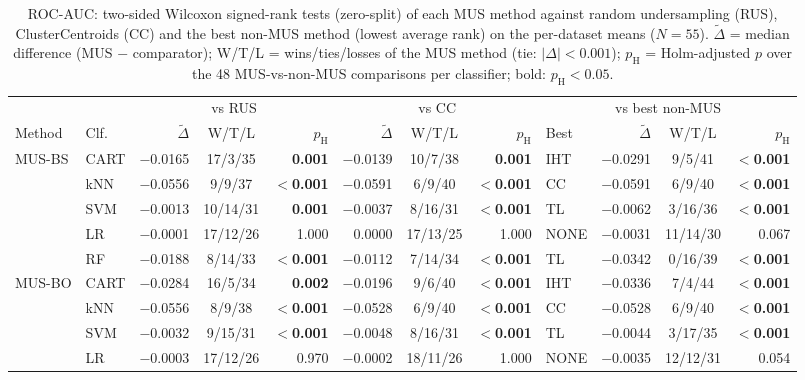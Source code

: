\begin{table}[!htbp]
\centering
\caption{ROC-AUC: two-sided Wilcoxon signed-rank tests (zero-split) of each MUS method against random undersampling (RUS), ClusterCentroids (CC) and the best non-MUS method (lowest average rank) on the per-dataset means ($N=55$). $\tilde\Delta$ = median difference (MUS $-$ comparator); W/T/L = wins/ties/losses of the MUS method (tie: $|\Delta|<0.001$); $p_\mathrm{H}$ = Holm-adjusted $p$ over the 48 MUS-vs-non-MUS comparisons per classifier; bold: $p_\mathrm{H}<0.05$.}
\label{tab:wilcoxon_auc}
\scriptsize
\setlength{\tabcolsep}{3pt}
\begin{adjustbox}{max width=\linewidth}
\begin{tabular}{llrcrrcrlrcr}
\toprule
 & & \multicolumn{3}{c}{vs RUS} & \multicolumn{3}{c}{vs CC} & \multicolumn{4}{c}{vs best non-MUS} \\
\cmidrule(lr){3-5}\cmidrule(lr){6-8}\cmidrule(lr){9-12}
Method & Clf. & $\tilde\Delta$ & W/T/L & $p_\mathrm{H}$ & $\tilde\Delta$ & W/T/L & $p_\mathrm{H}$ & Best & $\tilde\Delta$ & W/T/L & $p_\mathrm{H}$ \\
\midrule
MUS-BS & CART & $-$0.0165 & 17/3/35 & \textbf{0.001} & $-$0.0139 & 10/7/38 & \textbf{0.001} & IHT & $-$0.0291 & 9/5/41 & \textbf{$<$0.001} \\
 & kNN & $-$0.0556 & 9/9/37 & \textbf{$<$0.001} & $-$0.0591 & 6/9/40 & \textbf{$<$0.001} & CC & $-$0.0591 & 6/9/40 & \textbf{$<$0.001} \\
 & SVM & $-$0.0013 & 10/14/31 & \textbf{0.001} & $-$0.0037 & 8/16/31 & \textbf{$<$0.001} & TL & $-$0.0062 & 3/16/36 & \textbf{$<$0.001} \\
 & LR & $-$0.0001 & 17/12/26 & 1.000 & 0.0000 & 17/13/25 & 1.000 & NONE & $-$0.0031 & 11/14/30 & 0.067 \\
 & RF & $-$0.0188 & 8/14/33 & \textbf{$<$0.001} & $-$0.0112 & 7/14/34 & \textbf{$<$0.001} & TL & $-$0.0342 & 0/16/39 & \textbf{$<$0.001} \\
\midrule
MUS-BO & CART & $-$0.0284 & 16/5/34 & \textbf{0.002} & $-$0.0196 & 9/6/40 & \textbf{$<$0.001} & IHT & $-$0.0336 & 7/4/44 & \textbf{$<$0.001} \\
 & kNN & $-$0.0556 & 8/9/38 & \textbf{$<$0.001} & $-$0.0528 & 6/9/40 & \textbf{$<$0.001} & CC & $-$0.0528 & 6/9/40 & \textbf{$<$0.001} \\
 & SVM & $-$0.0032 & 9/15/31 & \textbf{$<$0.001} & $-$0.0048 & 8/16/31 & \textbf{$<$0.001} & TL & $-$0.0044 & 3/17/35 & \textbf{$<$0.001} \\
 & LR & $-$0.0003 & 17/12/26 & 0.970 & $-$0.0002 & 18/11/26 & 1.000 & NONE & $-$0.0035 & 12/12/31 & 0.054 \\

\end{tabular}
\end{adjustbox}
\end{table}
